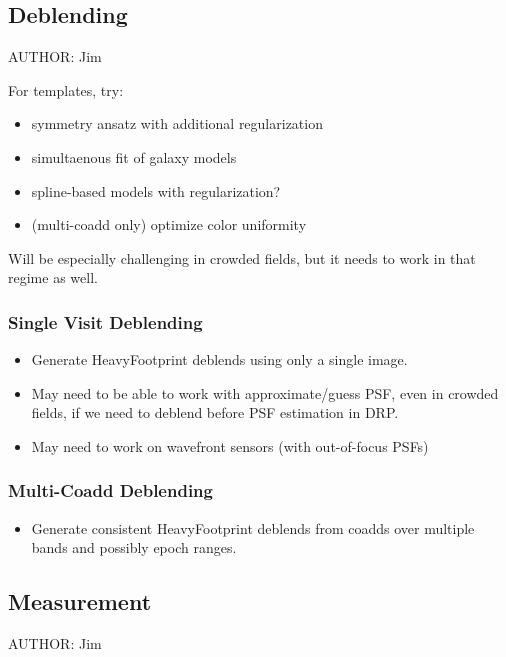 \subsection{Deblending}
\label{sec:acDeblending}
AUTHOR: Jim

For templates, try:
\begin{itemize}
\item symmetry ansatz with additional regularization
\item simultaenous fit of galaxy models
\item spline-based models with regularization?
\item (multi-coadd only) optimize color uniformity
\end{itemize}

Will be especially challenging in crowded fields, but it needs to work in that regime as well.

\subsubsection{Single Visit Deblending}
\label{sec:acSingleVisitDeblending}
\begin{itemize}
\item Generate HeavyFootprint deblends using only a single image.
\item May need to be able to work with approximate/guess PSF, even in crowded fields, if we need to deblend before PSF estimation in DRP.
\item May need to work on wavefront sensors (with out-of-focus PSFs)
\end{itemize}

\subsubsection{Multi-Coadd Deblending}
\label{sec:acMultiCoaddDeblending}
\begin{itemize}
\item Generate consistent HeavyFootprint deblends from coadds over multiple bands and possibly epoch ranges.
\end{itemize}

\subsection{Measurement}
\label{sec:acMeasurement}
AUTHOR: Jim

